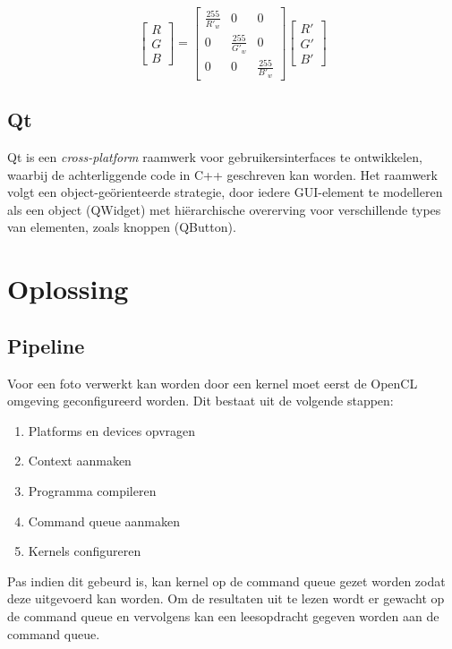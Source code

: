 \documentclass[twocolumn, a4paper]{article}
\begin{document}
\begin{equation}
\left[\begin{array}{c} R \\ G \\ B \end{array}\right]=\left[\begin{array}{ccc}\frac{255}{R'_w} & 0 & 0 \\ 0 & \frac{255}{G'_w} & 0 \\ 0 & 0 & \frac{255}{B'_w}\end{array}\right]\left[\begin{array}{c}R' \\ G' \\ B' \end{array}\right]
\end{equation}

\subsection{Qt}
Qt is een \emph{cross-platform} raamwerk voor gebruikersinterfaces te ontwikkelen, waarbij de achterliggende code in C++ geschreven kan worden. Het raamwerk volgt een object-geörienteerde strategie, door iedere GUI-element te modelleren als een object (QWidget) met hiërarchische overerving voor verschillende types van elementen, zoals knoppen (QButton).


\section{Oplossing}

\subsection{Pipeline}
Voor een foto verwerkt kan worden door een kernel moet eerst de OpenCL omgeving geconfigureerd worden. Dit bestaat uit de volgende stappen:

\begin{enumerate}
    \item Platforms en devices opvragen 
    \item Context aanmaken
    \item Programma compileren
    \item Command queue aanmaken
    \item Kernels configureren
\end{enumerate}
Pas indien dit gebeurd is, kan kernel op de command queue gezet worden zodat deze uitgevoerd kan worden. Om de resultaten uit te lezen wordt er gewacht op de command queue en vervolgens kan een leesopdracht gegeven worden aan de command queue. 
\end{document}
